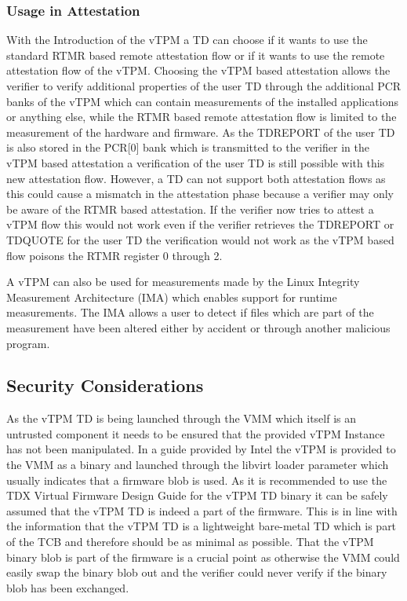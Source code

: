 \documentclass[sigplan,screen,nonacm]{acmart}
\begin{document}
\subsubsection{Usage in Attestation}
With the Introduction of the vTPM a TD can choose if it wants to use the standard RTMR based remote attestation flow or if it wants to use the remote attestation flow of the vTPM.
Choosing the vTPM based attestation allows the verifier to verify additional properties of the user TD through the additional PCR banks of the vTPM which can contain measurements of the installed applications or anything else, while the RTMR based remote attestation flow is limited to the measurement of the hardware and firmware.
As the TDREPORT of the user TD is also stored in the PCR[0] bank which is transmitted to the verifier in the vTPM based attestation a verification of the user TD is still possible with this new attestation flow.
However, a TD can not support both attestation flows as this could cause a mismatch in the attestation phase because a verifier may only be aware of the RTMR based attestation.
If the verifier now tries to attest a vTPM flow this would not work even if the verifier retrieves the TDREPORT or TDQUOTE for the user TD the verification would not work as the vTPM based flow poisons the RTMR register 0 through 2.

A vTPM can also be used for measurements made by the Linux Integrity Measurement Architecture (IMA) which enables support for runtime measurements\cite{Intel-IMA}.
The IMA allows a user to detect if files which are part of the measurement have been altered either by accident or through another malicious program.

\subsection{Security Considerations}
As the vTPM TD is being launched through the VMM which itself is an untrusted component it needs to be ensured that the provided vTPM Instance has not been manipulated.
In a guide provided by Intel the vTPM is provided to the VMM as a binary and launched through the libvirt loader parameter which usually indicates that a firmware blob is used\cite[p. 84]{Intel-linux-tdx}\cite{libvirt}.
As it is recommended to use the TDX Virtual Firmware Design Guide for the vTPM TD binary it can be safely assumed that the vTPM TD is indeed a part of the firmware\cite[p. 20]{Intel-vTPM}.
This is in line with the information that the vTPM TD is a lightweight bare-metal TD which is part of the TCB and therefore should be as minimal as possible\cite[p. 18]{Intel-vTPM}.
That the vTPM binary blob is part of the firmware is a crucial point as otherwise the VMM could easily swap the binary blob out and the verifier could never verify if the binary blob has been exchanged.
\end{document}
